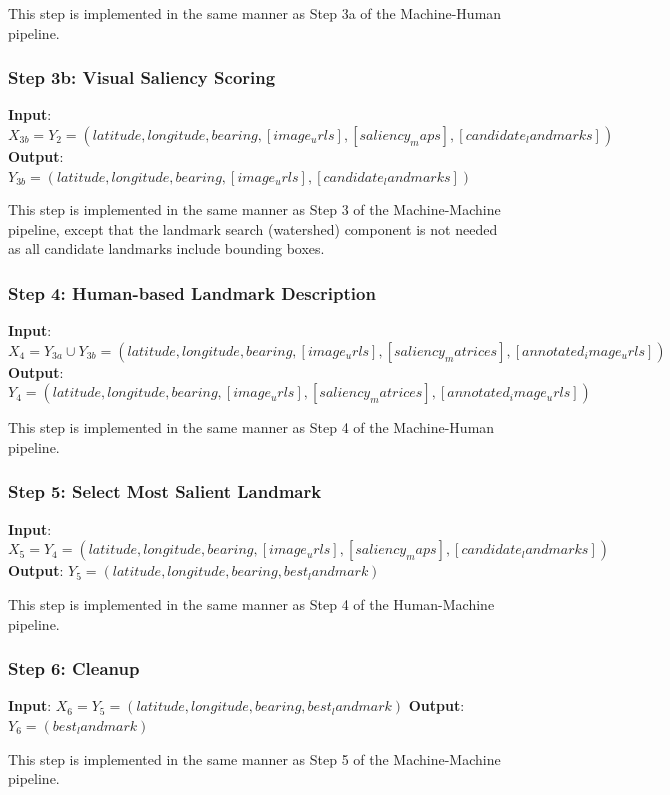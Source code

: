 This step is implemented in the same manner as Step 3a of the Machine-Human pipeline.

\subsubsection*{Step 3b: Visual Saliency Scoring}

\textbf{Input}: $X_{3b} = Y_2 = (latitude, longitude, bearing,  [image_urls], [saliency_maps], [candidate_landmarks] )$
\textbf{Output}: $Y_{3b} = (latitude, longitude, bearing,  [image_urls], [candidate_landmarks] )$ 

This step is implemented in the same manner as Step 3 of the Machine-Machine pipeline, except that the landmark search (watershed) component is not needed as all candidate landmarks include bounding boxes.

\subsubsection*{Step 4: Human-based Landmark Description}

\textbf{Input}: $X_4 = Y_{3a} \cup Y_{3b} = (latitude, longitude, bearing, [image_urls], [saliency_matrices], [annotated_image_urls])$ 
\textbf{Output}: $Y_4 = (latitude, longitude, bearing, [image_urls], [saliency_matrices], [annotated_image_urls])$ 

This step is implemented in the same manner as Step 4 of the Machine-Human pipeline.

\subsubsection*{Step 5: Select Most Salient Landmark}

\textbf{Input}: $X_5 = Y_4 = (latitude, longitude, bearing,  [image_urls], [saliency_maps], [candidate_landmarks] )$
\textbf{Output}: $Y_5 = (latitude, longitude, bearing, best_landmark)$
 
This step is implemented in the same manner as Step 4 of the Human-Machine pipeline.

\subsubsection*{Step 6: Cleanup}

\textbf{Input}: $X_6 = Y_5 = (latitude, longitude, bearing, best_landmark)$
\textbf{Output}: $Y_6 = (best_landmark)$

This step is implemented in the same manner as Step 5 of the Machine-Machine pipeline.



